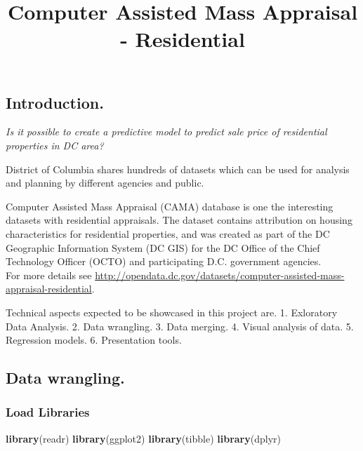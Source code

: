 \documentclass[]{article}
\title{Computer Assisted Mass Appraisal - Residential}
\author{}
\date{}
\newenvironment{Shaded}{\begin{snugshade}}{\end{snugshade}}
\newcommand{\KeywordTok}[1]{\textcolor[rgb]{0.13,0.29,0.53}{\textbf{#1}}}
\newcommand{\NormalTok}[1]{#1}
\begin{document}
\maketitle

{
\setcounter{tocdepth}{2}
\tableofcontents
}
\hypertarget{introduction.}{%
\subsection{Introduction.}\label{introduction.}}

\emph{Is it possible to create a predictive model to predict sale price
of residential properties in DC area?}

District of Columbia shares hundreds of datasets which can be used for
analysis and planning by different agencies and public.

Computer Assisted Mass Appraisal (CAMA) database is one the interesting
datasets with residential appraisals. The dataset contains attribution
on housing characteristics for residential properties, and was created
as part of the DC Geographic Information System (DC GIS) for the DC
Office of the Chief Technology Officer (OCTO) and participating D.C.
government agencies.\\
For more details see
\url{http://opendata.dc.gov/datasets/computer-assisted-mass-appraisal-residential}.

Technical aspects expected to be showcased in this project are. 1.
Exloratory Data Analysis. 2. Data wrangling. 3. Data merging. 4. Visual
analysis of data. 5. Regression models. 6. Presentation tools.

\hypertarget{data-wrangling.}{%
\subsection{Data wrangling.}\label{data-wrangling.}}

\hypertarget{load-libraries}{%
\subsubsection{Load Libraries}\label{load-libraries}}

\begin{Shaded}
\begin{Highlighting}[]
\KeywordTok{library}\NormalTok{(readr)}
\KeywordTok{library}\NormalTok{(ggplot2)}
\KeywordTok{library}\NormalTok{(tibble)}
\KeywordTok{library}\NormalTok{(dplyr)}
\end{Highlighting}
\end{Shaded}
\end{document}
